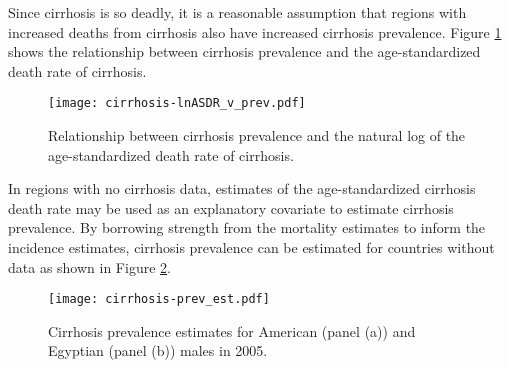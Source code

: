 Since cirrhosis is so deadly, it is a reasonable assumption that
regions with increased deaths from cirrhosis also have increased
cirrhosis prevalence.  Figure \ref{fig:app-cirrhosis asp} shows the
relationship between cirrhosis prevalence and the age-standardized
death rate of cirrhosis.

    \begin{figure}[h]
        \begin{center}
            \texttt{[image: cirrhosis-lnASDR\_v\_prev.pdf]}
            \caption{Relationship between cirrhosis prevalence and the
              natural log of the age-standardized death rate of
              cirrhosis.}
            \label{fig:app-cirrhosis asp}
        \end{center}
    \end{figure}

In regions with no cirrhosis data, estimates of the age-standardized
cirrhosis death rate may be used as an explanatory covariate to
estimate cirrhosis prevalence.  By borrowing strength from the
mortality estimates to inform the incidence estimates, cirrhosis
prevalence can be estimated for countries without data as shown in
Figure \ref{fig:app-cirrhosis prev est}.

    \begin{figure}[h]
        \begin{center}
            \texttt{[image: cirrhosis-prev\_est.pdf]}
            \caption{Cirrhosis prevalence estimates for American
              (panel (a)) and Egyptian (panel (b)) males in 2005.}
            \label{fig:app-cirrhosis prev est}
        \end{center}
    \end{figure}
